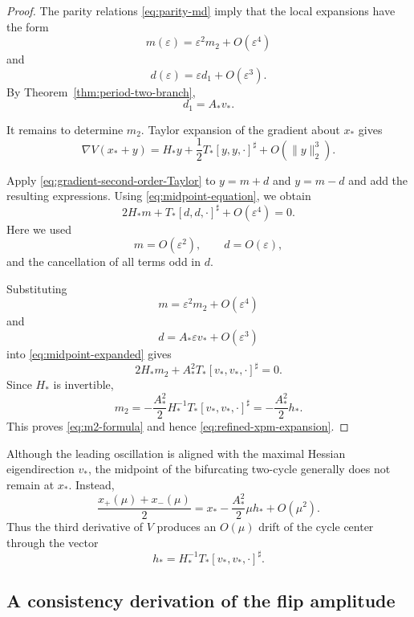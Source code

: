 \begin{proof}
The parity relations \eqref{eq:parity-md} imply that the local
expansions have the form
\[
m(\varepsilon)
=
\varepsilon^2m_2+O(\varepsilon^4)
\]
and
\[
d(\varepsilon)
=
\varepsilon d_1+O(\varepsilon^3).
\]
By Theorem~\ref{thm:period-two-branch},
\[
d_1=A_*v_*.
\]

It remains to determine $m_2$.
Taylor expansion of the gradient about $x_*$ gives
\begin{equation}
\nabla V(x_*+y)
=
H_*y
+
\frac12
T_*[y,y,\cdot]^\sharp
+
O(\|y\|_2^3).
\label{eq:gradient-second-order-Taylor}
\end{equation}

Apply \eqref{eq:gradient-second-order-Taylor} to
$y=m+d$ and $y=m-d$ and add the resulting expressions.
Using \eqref{eq:midpoint-equation}, we obtain
\begin{equation}
2H_*m
+
T_*[d,d,\cdot]^\sharp
+
O(\varepsilon^4)
=
0.
\label{eq:midpoint-expanded}
\end{equation}
Here we used
\[
m=O(\varepsilon^2),
\qquad
d=O(\varepsilon),
\]
and the cancellation of all terms odd in $d$.

Substituting
\[
m=\varepsilon^2m_2+O(\varepsilon^4)
\]
and
\[
d=A_*\varepsilon v_*+O(\varepsilon^3)
\]
into \eqref{eq:midpoint-expanded} gives
\[
2H_*m_2
+
A_*^2
T_*[v_*,v_*,\cdot]^\sharp
=
0.
\]
Since $H_*$ is invertible,
\[
m_2
=
-\frac{A_*^2}{2}
H_*^{-1}
T_*[v_*,v_*,\cdot]^\sharp
=
-\frac{A_*^2}{2}h_*.
\]
This proves \eqref{eq:m2-formula} and hence
\eqref{eq:refined-xpm-expansion}.
\end{proof}

\begin{remark}
\label{rem:midpoint-drift}
Although the leading oscillation is aligned with the maximal
Hessian eigendirection $v_*$, the midpoint of the bifurcating
two-cycle generally does not remain at $x_*$. Instead,
\[
\frac{x_+(\mu)+x_-(\mu)}{2}
=
x_*
-
\frac{A_*^2}{2}\mu h_*
+
O(\mu^2).
\]
Thus the third derivative of $V$ produces an $O(\mu)$ drift of the
cycle center through the vector
\[
h_*
=
H_*^{-1}
T_*[v_*,v_*,\cdot]^\sharp.
\]
\end{remark}

\subsection{A consistency derivation of the flip amplitude}
\label{subsec:amplitude-consistency}

